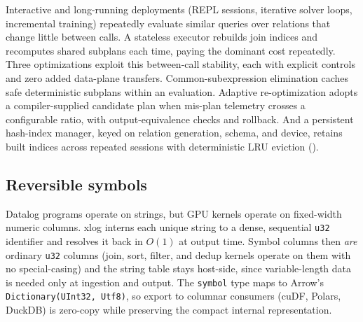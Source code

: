 Interactive and long-running deployments (REPL sessions, iterative solver loops, incremental training) repeatedly evaluate similar queries over relations that change little between calls. A stateless executor rebuilds join indices and recomputes shared subplans each time, paying the dominant cost repeatedly. Three optimizations exploit this between-call stability, each with explicit controls and zero added data-plane transfers. Common-subexpression elimination caches safe deterministic subplans within an evaluation. Adaptive re-optimization adopts a compiler-supplied candidate plan when mis-plan telemetry crosses a configurable ratio, with output-equivalence checks and rollback. And a persistent hash-index manager, keyed on relation generation, schema, and device, retains built indices across repeated sessions with deterministic LRU eviction ().

\subsection{Reversible symbols}

Datalog programs operate on strings, but GPU kernels operate on fixed-width numeric columns. xlog interns each unique string to a dense, sequential \texttt{u32} identifier and resolves it back in $O(1)$ at output time. Symbol columns then \emph{are} ordinary \texttt{u32} columns (join, sort, filter, and dedup kernels operate on them with no special-casing) and the string table stays host-side, since variable-length data is needed only at ingestion and output. The \texttt{symbol} type maps to Arrow's \texttt{Dictionary(UInt32, Utf8)}, so export to columnar consumers (cuDF, Polars, DuckDB) is zero-copy while preserving the compact internal representation.
